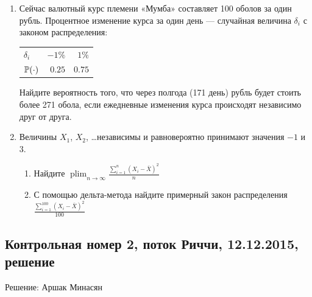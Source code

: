 \documentclass[12pt, a4paper]{article}\usepackage[]{graphicx}\usepackage[]{color}
\DeclareMathOperator*\plim{plim}
\begin{document}
\begin{enumerate}
					\item Сейчас валютный курс племени «Мумба» составляет 100 оболов за один рубль. Процентное изменение курса за один день — случайная величина $\delta_i$ с законом распределения:

					\begin{center}
						\begin{tabular}{lrr}
							\toprule
							$\delta_i$ & $-1\%$  & $1\%$ \\
							$\P(\cdot)$ & $0.25$  & $0.75$ \\
							\bottomrule
						\end{tabular}
					\end{center}

					Найдите вероятность того, что через полгода (171 день) рубль будет стоить более 271 обола, если ежедневные изменения курса происходят независимо друг от друга.

					\item Величины $X_1$, $X_2$, \ldots независимы и равновероятно принимают значения $-1$ и $3$.
					\begin{enumerate}
						\item Найдите $\plim_{n\to\infty} \frac{\sum_{i=1}^n(X_i-\bar X)^2}{n}$
						\item С помощью дельта-метода найдите примерный закон распределения $\frac{\sum_{i=1}^{100}(X_i-\bar X)^2}{100}$
					\end{enumerate}

				\end{enumerate}

				\subsection{Контрольная номер 2, поток Риччи, 12.12.2015, решение}

				Решение: Аршак Минасян
\end{document}
